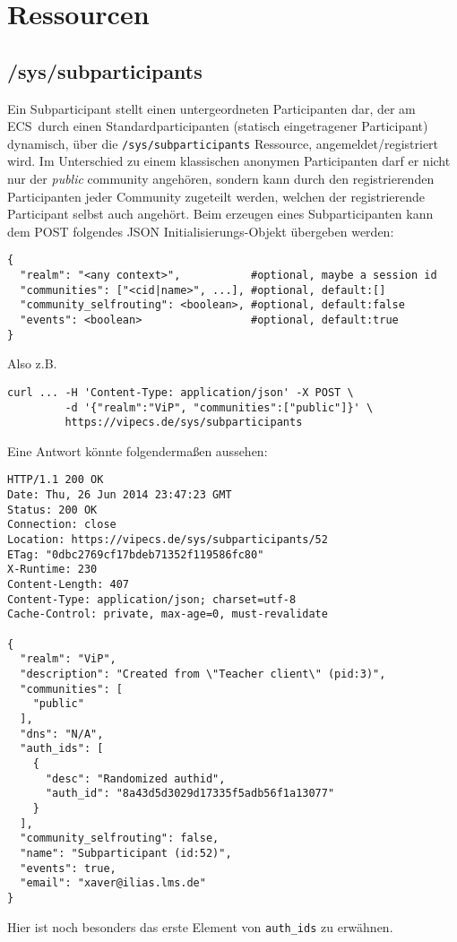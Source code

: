 \documentclass[dvips,12pt,a4paper]{article}
\newcommand{\ecs}{ECS}
\begin{document}
\section{Ressourcen}
\subsection{/sys/subparticipants}
Ein Subparticipant stellt einen untergeordneten Participanten dar, der am \ecs\
durch einen Standardparticipanten (statisch eingetragener Participant)
dynamisch, über die \texttt{/sys/subparticipants} Ressource,
angemeldet/registriert wird. Im Unterschied zu einem klassischen anonymen
Participanten darf er nicht nur der \textit{public} community angehören,
sondern kann durch den registrierenden Participanten jeder Community zugeteilt
werden, welchen der registrierende Participant selbst auch angehört. Beim
erzeugen eines Subparticipanten kann dem POST folgendes JSON
Initialisierungs-Objekt übergeben werden: 
\begin{verbatim}
{
  "realm": "<any context>",           #optional, maybe a session id
  "communities": ["<cid|name>", ...], #optional, default:[]
  "community_selfrouting": <boolean>, #optional, default:false
  "events": <boolean>                 #optional, default:true
}
\end{verbatim}
Also z.B.
\begin{verbatim}
curl ... -H 'Content-Type: application/json' -X POST \
         -d '{"realm":"ViP", "communities":["public"]}' \
         https://vipecs.de/sys/subparticipants
\end{verbatim}
Eine Antwort könnte folgendermaßen aussehen:
\begin{verbatim}
HTTP/1.1 200 OK
Date: Thu, 26 Jun 2014 23:47:23 GMT
Status: 200 OK
Connection: close
Location: https://vipecs.de/sys/subparticipants/52
ETag: "0dbc2769cf17bdeb71352f119586fc80"
X-Runtime: 230
Content-Length: 407
Content-Type: application/json; charset=utf-8
Cache-Control: private, max-age=0, must-revalidate

{
  "realm": "ViP",
  "description": "Created from \"Teacher client\" (pid:3)",
  "communities": [
    "public"
  ],
  "dns": "N/A",
  "auth_ids": [
    {
      "desc": "Randomized authid",
      "auth_id": "8a43d5d3029d17335f5adb56f1a13077"
    }
  ],
  "community_selfrouting": false,
  "name": "Subparticipant (id:52)",
  "events": true,
  "email": "xaver@ilias.lms.de"
}
\end{verbatim}
Hier ist noch besonders das erste Element von \texttt{auth\_ids} zu erwähnen.
\end{document}
